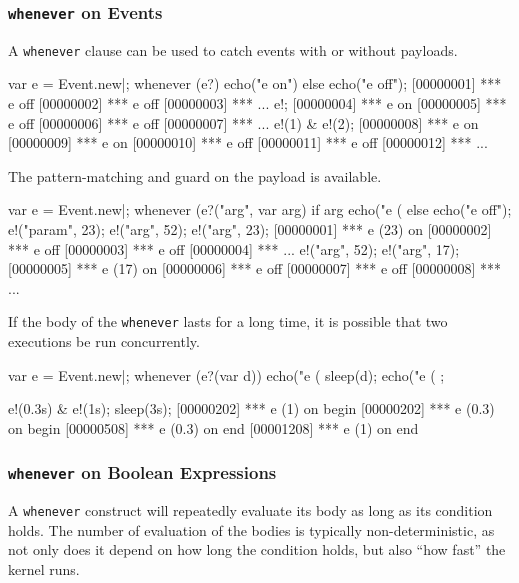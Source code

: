 \subsubsection{\lstinline'whenever' on Events}

A \lstinline'whenever' clause can be used to catch events with or
without payloads.

\begin{urbiunchecked}[firstnumber=1]
var e = Event.new|;
whenever (e?)
  echo("e on")
else
  echo("e off");
[00000001] *** e off
[00000002] *** e off
[00000003] *** ...
e!;
[00000004] *** e on
[00000005] *** e off
[00000006] *** e off
[00000007] *** ...
e!(1) & e!(2);
[00000008] *** e on
[00000009] *** e on
[00000010] *** e off
[00000011] *** e off
[00000012] *** ...
\end{urbiunchecked}

The pattern-matching and guard on the payload is available.

\begin{urbiunchecked}[firstnumber=1]
var e = Event.new|;
whenever (e?("arg", var arg) if arg %
  echo("e (%
else
  echo("e off");
e!("param", 23);
e!("arg", 52);
e!("arg", 23);
[00000001] *** e (23) on
[00000002] *** e off
[00000003] *** e off
[00000004] *** ...
e!("arg", 52);
e!("arg", 17);
[00000005] *** e (17) on
[00000006] *** e off
[00000007] *** e off
[00000008] *** ...
\end{urbiunchecked}


If the body of the \lstinline|whenever| lasts for a long time, it is
possible that two executions be run concurrently.

\begin{urbiscript}[firstnumber=1]
var e = Event.new|;
whenever (e?(var d))
{
  echo("e (%
  sleep(d);
  echo("e (%
};

e!(0.3s) & e!(1s);
sleep(3s);
[00000202] *** e (1) on begin
[00000202] *** e (0.3) on begin
[00000508] *** e (0.3) on end
[00001208] *** e (1) on end
\end{urbiscript}

\subsubsection{\lstinline'whenever' on Boolean Expressions}

A \lstinline'whenever' construct will repeatedly evaluate its body as
long as its condition holds.  The number of evaluation of the bodies
is typically non-deterministic, as not only does it depend on how
long the condition holds, but also ``how fast'' the \urbi kernel runs.

